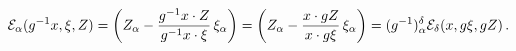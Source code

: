 \begin{equation}
{\cal E}_{\alpha}(g^{-1}x,\xi,Z)=
\left(Z_{\alpha}-\frac{g^{-1}x\cdot Z}{g^{-1}x\cdot
\xi}\,{\xi_{\alpha}}\right)= \left(Z_{\alpha}-\frac{x\cdot
gZ}{x\cdot
g\xi}\,{\xi_{\alpha}}\right)=(g^{-1})_{\alpha}^{\delta}{\cal
E}_{\delta}(x,g\xi,gZ)\,.
\end{equation}

